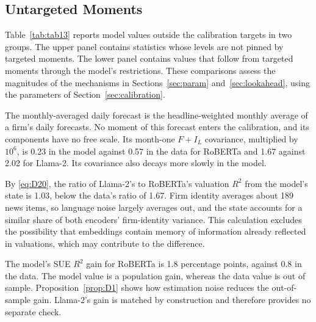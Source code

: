 \documentclass[11pt,letterpaper]{article}
\let\oldsubsection\subsection
\renewcommand{\subsection}{\FloatBarrier\oldsubsection}
\theoremstyle{remark}
\begin{document}
\subsection{Untargeted Moments}

Table~\ref{tab:tab13} reports model values outside the calibration targets in two groups. The upper panel contains statistics whose levels are not pinned by targeted moments. The lower panel contains values that follow from targeted moments through the model's restrictions. These comparisons assess the magnitudes of the mechanisms in Sections~\ref{sec:param} and~\ref{sec:lookahead}, using the parameters of Section~\ref{sec:calibration}.

The monthly-averaged daily forecast is the headline-weighted monthly average of a firm's daily forecasts. No moment of this forecast enters the calibration, and its components have no free scale. Its month-one $F+I_L$ covariance, multiplied by $10^6$, is 0.23 in the model against 0.57 in the data for RoBERTa and 1.67 against 2.02 for Llama-2. Its covariance also decays more slowly in the model.

By \eqref{eq:D20}, the ratio of Llama-2's to RoBERTa's valuation $R^2$ from the model's state is 1.03, below the data's ratio of 1.67. Firm identity averages about 189 news items, so language noise largely averages out, and the state accounts for a similar share of both encoders' firm-identity variance. This calculation excludes the possibility that embeddings contain memory of information already reflected in valuations, which may contribute to the difference.

The model's SUE $R^2$ gain for RoBERTa is 1.8 percentage points, against 0.8 in the data. The model value is a population gain, whereas the data value is out of sample. Proposition~\ref{prop:D1} shows how estimation noise reduces the out-of-sample gain. Llama-2's gain is matched by construction and therefore provides no separate check.
\end{document}
